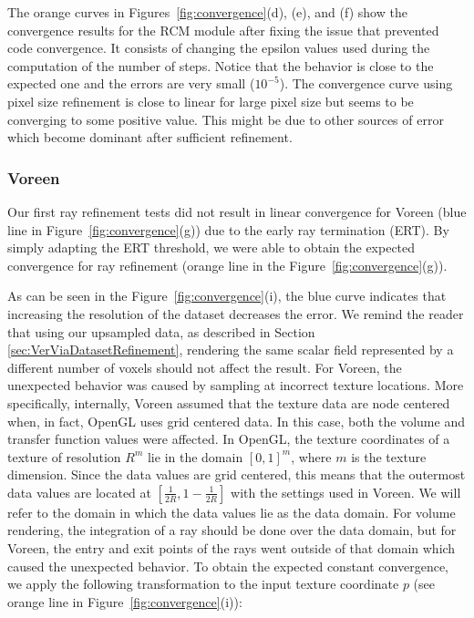 The orange curves in Figures~\ref{fig:convergence}(d), (e), and (f)
show the convergence results for the RCM module after fixing the issue
that prevented code convergence. It consists of changing the epsilon
values used during the computation of the number of steps. Notice that
the behavior is close to the expected one and the errors are very
small ($10^{-5}$). The convergence curve using pixel size refinement
is close to linear for large pixel size but seems to be converging to
some positive value. This might be due to other sources of error which
become dominant after sufficient refinement.


\subsubsection{Voreen}

Our first ray refinement tests did not result in linear convergence
for Voreen (blue line in Figure~\ref{fig:convergence}(g)) due to the
early ray termination (ERT). By simply adapting the ERT threshold, we
were able to obtain the expected convergence for ray refinement
(orange line in the Figure~\ref{fig:convergence}(g)).

As can be seen in the Figure~\ref{fig:convergence}(i), the blue curve
indicates that increasing the resolution of the dataset decreases the
error.  We remind the reader that using our upsampled data, as
described in Section \ref{sec:VerViaDatasetRefinement}, rendering the
same scalar field represented by a different number of voxels should
not affect the result.  For Voreen, the unexpected behavior was caused
by sampling at incorrect texture locations.  More specifically,
internally, Voreen assumed that the texture data are node centered
when, in fact, OpenGL uses grid centered data. In this case, both the
volume and transfer function values were affected. In OpenGL, the
texture coordinates of a texture of resolution $R^m$ lie in the domain
$[0, 1]^m$, where $m$ is the texture dimension. Since the data values
are grid centered, this means that the outermost data values are
located at $[\frac{1}{2R}, 1-\frac{1}{2R}]$ with the settings used in
Voreen.  We will refer to the domain in which the data values lie as
the data domain.  For volume rendering, the integration of a ray
should be done over the data domain, but for Voreen, the entry and
exit points of the rays went outside of that domain which caused the
unexpected behavior.  To obtain the expected constant convergence, we
apply the following transformation to the input texture coordinate $p$
(see orange line in Figure~\ref{fig:convergence}(i)):

